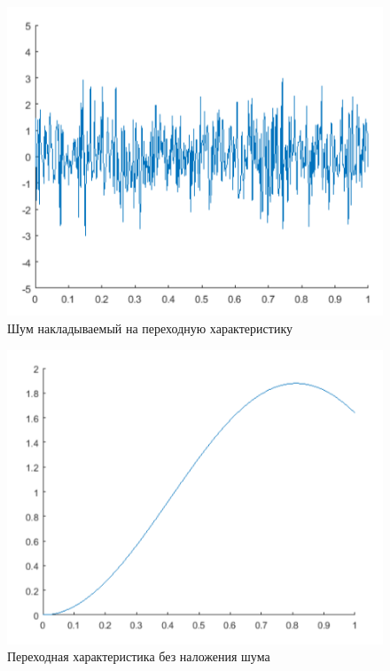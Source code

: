 \begin{figure}[h!]
	\centering
	\includegraphics[scale = 0.80]{images/noise.png}
	\caption{Шум накладываемый на переходную характеристику}
	\label{image:9}
\end{figure}

\FloatBarrier


\begin{figure}[h!]
	\centering
	\includegraphics[scale = 0.80]{images/wnoise.png}
	\caption{Переходная характеристика без наложения шума}
	\label{image:9}
\end{figure}
\FloatBarrier


